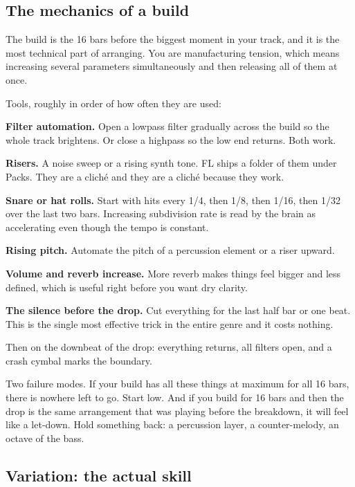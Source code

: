 \subsection{The mechanics of a build}\label{th06_arrangement-the-mechanics-of-a-build}

The build is the 16 bars before the biggest moment in your track, and it is the most
technical part of arranging. You are manufacturing tension, which means increasing several
parameters simultaneously and then releasing all of them at once.

Tools, roughly in order of how often they are used:

\textbf{Filter automation.} Open a lowpass filter gradually across the build so the whole track
brightens. Or close a highpass so the low end returns. Both work.

\textbf{Risers.} A noise sweep or a rising synth tone. FL ships a folder of them under Packs.
They are a cliché and they are a cliché because they work.

\textbf{Snare or hat rolls.} Start with hits every 1/4, then 1/8, then 1/16, then 1/32 over the
last two bars. Increasing subdivision rate is read by the brain as accelerating even though
the tempo is constant.

\textbf{Rising pitch.} Automate the pitch of a percussion element or a riser upward.

\textbf{Volume and reverb increase.} More reverb makes things feel bigger and less defined, which
is useful right before you want dry clarity.

\textbf{The silence before the drop.} Cut everything for the last half bar or one beat. This is
the single most effective trick in the entire genre and it costs nothing.

Then on the downbeat of the drop: everything returns, all filters open, and a crash cymbal
marks the boundary.

Two failure modes. If your build has all these things at maximum for all 16 bars, there is
nowhere left to go. Start low. And if you build for 16 bars and then the drop is the same
arrangement that was playing before the breakdown, it will feel like a let-down. Hold
something back: a percussion layer, a counter-melody, an octave of the bass.

\subsection{Variation: the actual skill}\label{th06_arrangement-variation-the-actual-skill}

